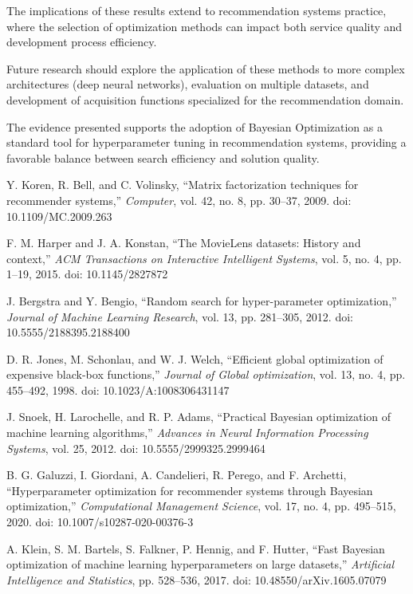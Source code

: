 \documentclass[conference]{IEEEtran}
\begin{document}
The implications of these results extend to recommendation systems practice, where the selection of optimization methods can impact both service quality and development process efficiency.

Future research should explore the application of these methods to more complex architectures (deep neural networks), evaluation on multiple datasets, and development of acquisition functions specialized for the recommendation domain.

The evidence presented supports the adoption of Bayesian Optimization as a standard tool for hyperparameter tuning in recommendation systems, providing a favorable balance between search efficiency and solution quality.

\begin{thebibliography}{00}

Y. Koren, R. Bell, and C. Volinsky, ``Matrix factorization techniques for recommender systems,'' \textit{Computer}, vol. 42, no. 8, pp. 30--37, 2009. doi: 10.1109/MC.2009.263

F. M. Harper and J. A. Konstan, ``The MovieLens datasets: History and context,'' \textit{ACM Transactions on Interactive Intelligent Systems}, vol. 5, no. 4, pp. 1--19, 2015. doi: 10.1145/2827872

J. Bergstra and Y. Bengio, ``Random search for hyper-parameter optimization,'' \textit{Journal of Machine Learning Research}, vol. 13, pp. 281--305, 2012. doi: 10.5555/2188395.2188400

D. R. Jones, M. Schonlau, and W. J. Welch, ``Efficient global optimization of expensive black-box functions,'' \textit{Journal of Global optimization}, vol. 13, no. 4, pp. 455--492, 1998. doi: 10.1023/A:1008306431147

J. Snoek, H. Larochelle, and R. P. Adams, ``Practical Bayesian optimization of machine learning algorithms,'' \textit{Advances in Neural Information Processing Systems}, vol. 25, 2012. doi: 10.5555/2999325.2999464

B. G. Galuzzi, I. Giordani, A. Candelieri, R. Perego, and F. Archetti, ``Hyperparameter optimization for recommender systems through Bayesian optimization,'' \textit{Computational Management Science}, vol. 17, no. 4, pp. 495--515, 2020. doi: 10.1007/s10287-020-00376-3

A. Klein, S. M. Bartels, S. Falkner, P. Hennig, and F. Hutter, ``Fast Bayesian optimization of machine learning hyperparameters on large datasets,'' \textit{Artificial Intelligence and Statistics}, pp. 528--536, 2017. doi: 10.48550/arXiv.1605.07079


\end{thebibliography}
\end{document}
